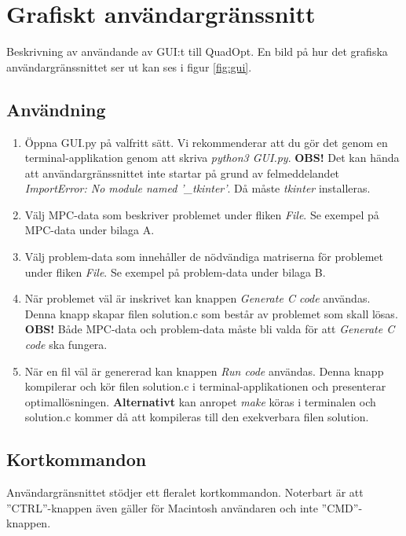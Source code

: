 \section{Grafiskt användargränssnitt}
Beskrivning av användande av GUI:t till QuadOpt. En bild på hur det grafiska användargränssnittet ser ut kan ses i figur \ref{fig:gui}.


\subsection{Användning}
\begin{enumerate}
\item Öppna GUI.py på valfritt sätt. Vi rekommenderar att du gör det genom en terminal-applikation genom att skriva \emph{python3 GUI.py}.
\newline
\newline
\textbf{OBS!} Det kan hända att användargränssnittet inte startar på grund av felmeddelandet \emph{ImportError: No module named '\_tkinter'}. Då måste \emph{tkinter} installeras.
\item Välj MPC-data som beskriver problemet under fliken \emph{File}. Se exempel på MPC-data under bilaga A.
\item Välj problem-data som innehåller de nödvändiga matriserna för problemet under fliken \emph{File}. Se exempel på problem-data under bilaga B.
\item När problemet väl är inskrivet kan knappen \emph{Generate C code} användas. Denna knapp skapar filen solution.c som består av problemet som skall lösas.
\newline
\newline
\textbf{OBS!} Både MPC-data och problem-data måste bli valda för att \emph{Generate C code} ska fungera.
\item När en fil väl är genererad kan knappen \emph{Run code} användas. Denna knapp kompilerar och kör filen solution.c i terminal-applikationen och presenterar optimallösningen. 
\newline
\newline
\textbf{Alternativt} kan anropet \emph{make} köras i terminalen och solution.c kommer då att kompileras till den exekverbara filen solution.
\end{enumerate}

\subsection{Kortkommandon}
Användargränsnittet stödjer ett fleralet kortkommandon. Noterbart är att ''CTRL''-knappen även gäller för Macintosh användaren och inte ''CMD''-knappen. 

